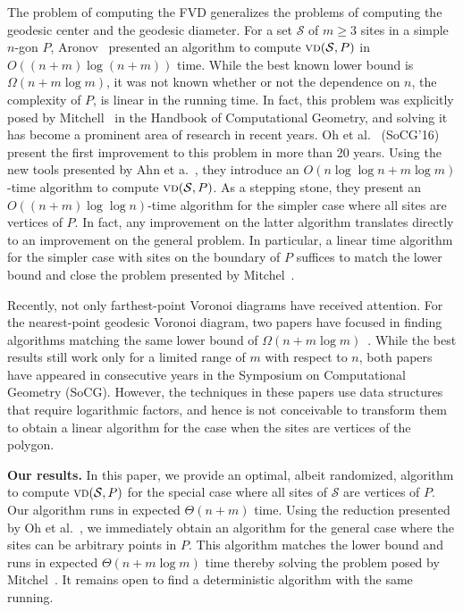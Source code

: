 \documentclass[a4paper, 11pt]{article}
\newcommand{\s}{\mathcal S}
\newcommand{\vd}[2][P]{\textsc{vd}(#2, #1)}
\begin{document}
The problem of computing the FVD generalizes the problems of computing the geodesic center and the geodesic diameter.  
For a set $\s$ of $m\geq 3$ sites in a simple $n$-gon $P$, Aronov~\cite{aronov1993furthest} presented an algorithm to compute $\vd{\s}$ in $O((n+m)\log (n+ m))$ time.  
While the best known lower bound is $\Omega(n + m \log m)$, it was not known whether or not the dependence on $n$, the complexity of $P$, is linear in the running time.  
In fact, this problem was explicitly posed by Mitchell~\cite[Chapter 27]{m-gspno-00} in the Handbook of Computational Geometry, and solving it has become a prominent area of research in recent years.
Oh et al.~\cite{oh2016farthest} (SoCG'16) present the first improvement to this problem in more than 20 years. 
Using the new tools presented by Ahn et a.~\cite{ahn2015linear}, they introduce an $O(n \log\log n+m\log m)$-time algorithm to compute $\vd{\s}$. 
As a stepping stone, they present an $O((n+m)\log\log n)$-time algorithm for the simpler case where all sites are vertices of $P$.
In fact, any improvement on the latter algorithm translates directly to an improvement on the general problem.
In particular, a linear time algorithm for the simpler case with sites on the boundary of $P$ suffices to match the lower bound and close the problem presented by Mitchel~\cite[Chapter 27]{m-gspno-00}.

Recently, not only farthest-point Voronoi diagrams have received attention. 
For the nearest-point geodesic Voronoi diagram, two papers have focused in finding algorithms matching the same lower bound of $\Omega(n + m\log m)$~\cite{chihungVoronoi,oh2017voronoi}.
While the best results still work only for a limited range of $m$ with respect to $n$, both papers have appeared in consecutive years in the Symposium on Computational Geometry (SoCG).
However, the techniques in these papers use data structures that require logarithmic factors, and hence is not conceivable to transform them to obtain a linear algorithm for the case when the sites are vertices of the polygon. 

\textbf{Our results.} 
In this paper, we provide an optimal, albeit randomized, algorithm to compute $\vd{\s}$ for the special case where all sites of $\s$ are vertices of $P$.
Our algorithm runs in expected $\Theta(n + m)$ time. 
Using the reduction presented by Oh et al.~\cite{oh2016farthest}, we immediately obtain an algorithm for the general case where the sites can be arbitrary points in $P$.
This algorithm matches the lower bound and runs in expected $\Theta(n + m\log m)$ time thereby solving the problem posed by Mitchel~\cite[Chapter 27]{m-gspno-00}.
It remains open to find a deterministic algorithm with the same running.
\end{document}
